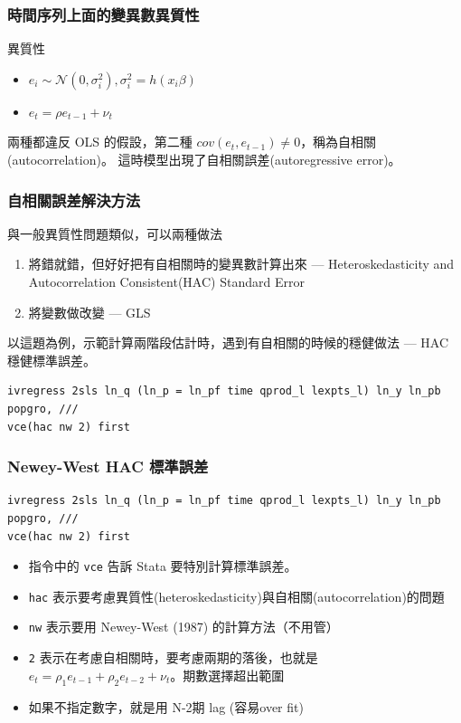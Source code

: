 \begin{frame}
    \frametitle{時間序列上面的變異數異質性}

    異質性
    \begin{itemize}
        \item $e_i \sim \mathcal{N}(0, \sigma_i^2), \sigma_i^2 = h(x_i\beta)$
        \item $e_t = \rho e_{t-1} + \nu_t$
    \end{itemize}

    兩種都違反 OLS 的假設，第二種 $cov(e_t, e_{t-1})\ne 0$，稱為自相關 (autocorrelation)。
    這時模型出現了自相關誤差(autoregressive error)。
\end{frame}

\begin{frame}[fragile]
    \frametitle{自相關誤差解決方法}

    與一般異質性問題類似，可以兩種做法
    \begin{enumerate}
        \item 將錯就錯，但好好把有自相關時的變異數計算出來 --- Heteroskedasticity and Autocorrelation Consistent(HAC) Standard Error
        \item 將變數做改變 --- GLS
    \end{enumerate}

    \vfill

    以這題為例，示範計算兩階段估計時，遇到有自相關的時候的穩健做法 --- HAC 穩健標準誤差。
    
    \begin{lstlisting}
ivregress 2sls ln_q (ln_p = ln_pf time qprod_l lexpts_l) ln_y ln_pb popgro, ///
vce(hac nw 2) first \end{lstlisting}
\end{frame}

\begin{frame}[fragile]
    \frametitle{Newey-West HAC 標準誤差}
\begin{lstlisting}
ivregress 2sls ln_q (ln_p = ln_pf time qprod_l lexpts_l) ln_y ln_pb popgro, ///
vce(hac nw 2) first \end{lstlisting}
    \begin{itemize}
        \item 指令中的 \texttt{vce} 告訴 Stata 要特別計算標準誤差。
        \item \texttt{hac} 表示要考慮異質性(heteroskedasticity)與自相關(autocorrelation)的問題
        \item \texttt{nw} 表示要用 Newey-West (1987) 的計算方法（不用管）
        \item \texttt{2} 表示在考慮自相關時，要考慮兩期的落後，也就是 $e_t = \rho_1 e_{t-1} + \rho_2 e_{t-2} + \nu_t$。期數選擇超出範圍
        \item 如果不指定數字，就是用 N-2期 lag (容易over fit)
    \end{itemize}
    
\end{frame}

